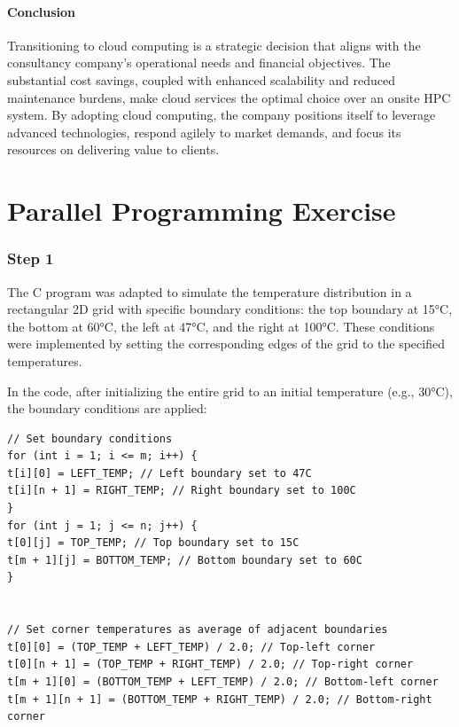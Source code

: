 \documentclass{article}
\begin{document}
\subsection{Conclusion}
Transitioning to cloud computing is a strategic decision that aligns with the consultancy company's operational needs and financial objectives. The substantial cost savings, coupled with enhanced scalability and reduced maintenance burdens, make cloud services the optimal choice over an onsite HPC system. By adopting cloud computing, the company positions itself to leverage advanced technologies, respond agilely to market demands, and focus its resources on delivering value to clients.

\newpage

\part{Parallel Programming Exercise}

\section{Step 1}

The C program was adapted to simulate the temperature distribution in a rectangular 2D grid with specific boundary conditions: the top boundary at 15°C, the bottom at 60°C, the left at 47°C, and the right at 100°C. These conditions were implemented by setting the corresponding edges of the grid to the specified temperatures.

In the code, after initializing the entire grid to an initial temperature (e.g., 30°C), the boundary conditions are applied:

\begin{lstlisting}[style=CStyle, caption={}]
// Set boundary conditions
for (int i = 1; i <= m; i++) {
t[i][0] = LEFT_TEMP; // Left boundary set to 47C
t[i][n + 1] = RIGHT_TEMP; // Right boundary set to 100C
}
for (int j = 1; j <= n; j++) {
t[0][j] = TOP_TEMP; // Top boundary set to 15C
t[m + 1][j] = BOTTOM_TEMP; // Bottom boundary set to 60C
}


// Set corner temperatures as average of adjacent boundaries
t[0][0] = (TOP_TEMP + LEFT_TEMP) / 2.0; // Top-left corner
t[0][n + 1] = (TOP_TEMP + RIGHT_TEMP) / 2.0; // Top-right corner
t[m + 1][0] = (BOTTOM_TEMP + LEFT_TEMP) / 2.0; // Bottom-left corner
t[m + 1][n + 1] = (BOTTOM_TEMP + RIGHT_TEMP) / 2.0; // Bottom-right corner
\end{lstlisting}
\end{document}
